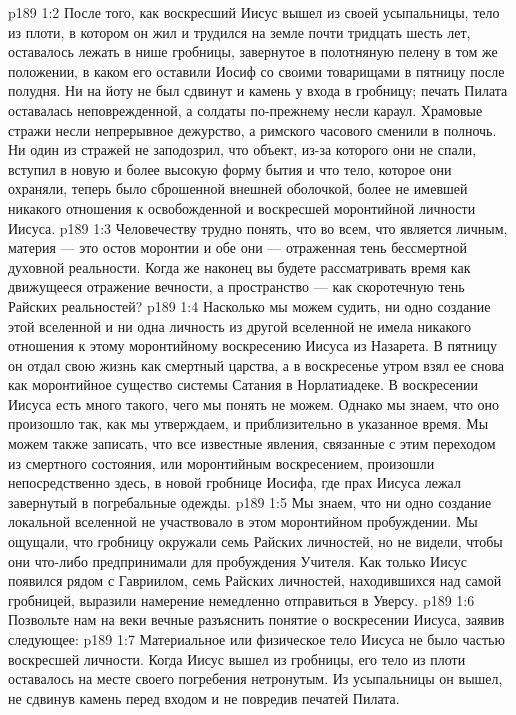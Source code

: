 \vs p189 1:2 После того, как воскресший Иисус вышел из своей усыпальницы, тело из плоти, в котором он жил и трудился на земле почти тридцать шесть лет, оставалось лежать в нише гробницы, завернутое в полотняную пелену в том же положении, в каком его оставили Иосиф со своими товарищами в пятницу после полудня. Ни на йоту не был сдвинут и камень у входа в гробницу; печать Пилата оставалась неповрежденной, а солдаты по\hyp{}прежнему несли караул. Храмовые стражи несли непрерывное дежурство, а римского часового сменили в полночь. Ни один из стражей не заподозрил, что объект, из\hyp{}за которого они не спали, вступил в новую и более высокую форму бытия и что тело, которое они охраняли, теперь было сброшенной внешней оболочкой, более не имевшей никакого отношения к освобожденной и воскресшей моронтийной личности Иисуса.
\vs p189 1:3 \pc Человечеству трудно понять, что во всем, что является личным, материя --- это остов моронтии и обе они --- отраженная тень бессмертной духовной реальности. Когда же наконец вы будете рассматривать время как движущееся отражение вечности, а пространство --- как скоротечную тень Райских реальностей?
\vs p189 1:4 Насколько мы можем судить, ни одно создание этой вселенной и ни одна личность из другой вселенной не имела никакого отношения к этому моронтийному воскресению Иисуса из Назарета. В пятницу он отдал свою жизнь как смертный царства, а в воскресенье утром взял ее снова как моронтийное существо системы Сатания в Норлатиадеке. В воскресении Иисуса есть много такого, чего мы понять не можем. Однако мы знаем, что оно произошло так, как мы утверждаем, и приблизительно в указанное время. Мы можем также записать, что все известные явления, связанные с этим переходом из смертного состояния, или моронтийным воскресением, произошли непосредственно здесь, в новой гробнице Иосифа, где прах Иисуса лежал завернутый в погребальные одежды.
\vs p189 1:5 Мы знаем, что ни одно создание локальной вселенной не участвовало в этом моронтийном пробуждении. Мы ощущали, что гробницу окружали семь Райских личностей, но не видели, чтобы они что\hyp{}либо предпринимали для пробуждения Учителя. Как только Иисус появился рядом с Гавриилом, семь Райских личностей, находившихся над самой гробницей, выразили намерение немедленно отправиться в Уверсу.
\vs p189 1:6 Позвольте нам на веки вечные разъяснить понятие о воскресении Иисуса, заявив следующее:
\vs p189 1:7 \bibnobreakspace Материальное или физическое тело Иисуса не было частью воскресшей личности. Когда Иисус вышел из гробницы, его тело из плоти оставалось на месте своего погребения нетронутым. Из усыпальницы он вышел, не сдвинув камень перед входом и не повредив печатей Пилата.
